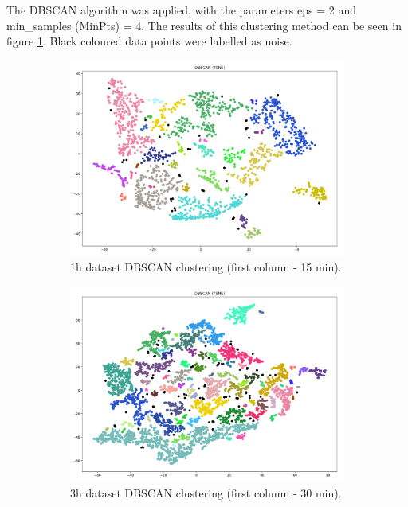 The DBSCAN algorithm was applied, with the parameters eps = 2 and min\_samples (MinPts) = 4. The results of this clustering method can be seen in figure \ref{figure:DBSCANResults}. Black coloured data points were labelled as noise.


\begin{figure}[H]
  \centering
  \begin{subfigure}{.5\textwidth}\captionsetup{width=.8\linewidth}
    \centering
    \includegraphics[width=1\textwidth]{./images/clusteringResults/1h-1-DBSCAN.png}
  \caption{1h dataset DBSCAN clustering (first column - 15 min).}
  \end{subfigure}%
  \hfill
  \begin{subfigure}{.5\textwidth}\captionsetup{width=.8\linewidth}
    \centering
    \includegraphics[width=1\textwidth]{./images/clusteringResults/3h-1-DBSCAN.png}
    \caption{3h dataset DBSCAN clustering (first column - 30 min).}
  \end{subfigure}
  \caption{}
  \label{figure:DBSCANResults}
  \end{figure}






